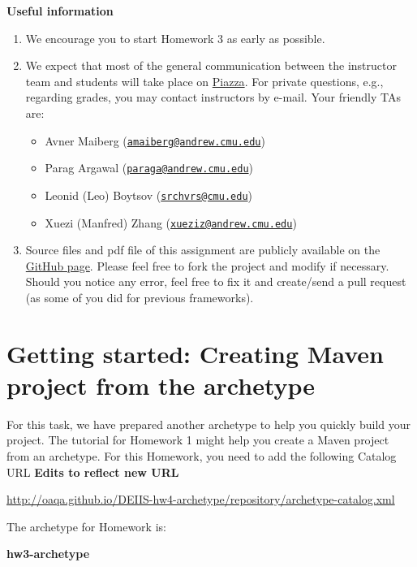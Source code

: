 \documentclass[oneside,11pt]{book}
\begin{document}
\textbf{Useful information}
\begin{enumerate}
\item We encourage you to start Homework 3 as early as possible.

\item 
We expect that most of the general communication between the instructor team and students will take place on 
\href{https://piazza.com/class/hyvsubeilei6dd}{Piazza}.
For private questions, e.g., regarding grades, you may contact instructors by e-mail.
Your friendly TAs are:
\begin{itemize}
\item Avner Maiberg (\href{mailto:amaiberg@andrew.cmu.edu}{\nolinkurl{amaiberg@andrew.cmu.edu}}) 
\item Parag Argawal (\href{mailto:paraga@andrew.cmu.edu}{\nolinkurl{paraga@andrew.cmu.edu}}) 
\item Leonid (Leo) Boytsov (\href{mailto:srchvrs@cmu.edu}{\nolinkurl{srchvrs@cmu.edu}})
\item Xuezi (Manfred) Zhang (\href{mailto:xueziz@andrew.cmu.edu}{\nolinkurl{xueziz@andrew.cmu.edu}}) 
\end{itemize}

\item Source files and pdf file of this assignment are publicly available on 
the  \href{http://github.com/amaiberg/software-engineering-preliminary}{GitHub page}.
Please feel free to fork the project and modify if necessary.
Should you notice any error, feel free to fix it and create/send a pull request (as some
of you did for previous frameworks).  

\end{enumerate}
\hspace{-0.1\textwidth}

\chapter*{Getting started: Creating Maven project from the archetype}
For this task, we have prepared another archetype to help you quickly build your project. 
The tutorial for Homework 1 might help you create a Maven project from an archetype.
For this Homework, you need to add the following Catalog URL 
\textbf{\color{red}Edits to reflect new URL}

\url{http://oaqa.github.io/DEIIS-hw4-archetype/repository/archetype-catalog.xml}


The archetype for Homework is:

\begin{center}\textbf{hw3-archetype}\end{center}
\end{document}
